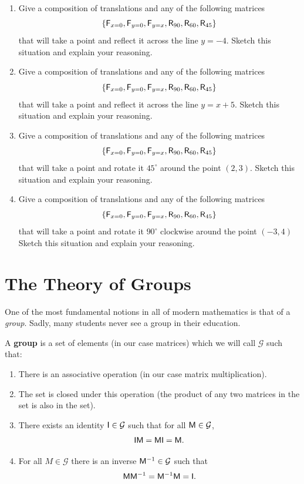\begin{enumerate}
\item Give a composition of translations and any of the following
  matrices
\[
\{\mathsf{F}_{x=0},\mathsf{F}_{y=0}, \mathsf{F}_{y=x}, \mathsf{R}_{90},\mathsf{R}_{60},\mathsf{R}_{45}\}
\]
that will take a point and reflect it across the line $y=-4$. Sketch
this situation and explain your reasoning.

\item Give a composition of translations and any of the following matrices
\[
\{\mathsf{F}_{x=0},\mathsf{F}_{y=0}, \mathsf{F}_{y=x}, \mathsf{R}_{90},\mathsf{R}_{60},\mathsf{R}_{45}\}
\]
that will take a
  point and reflect it across the line $y=x+5$. Sketch this situation
  and explain your reasoning.

\item Give a composition of translations and any of the following matrices
\[
\{
\mathsf{F}_{x=0},\mathsf{F}_{y=0}, \mathsf{F}_{y=x}, \mathsf{R}_{90},\mathsf{R}_{60},\mathsf{R}_{45}\}
\]
that will take a point and rotate it $45^\circ$ around the point
$(2,3)$. Sketch this situation and explain your reasoning.

\item Give a composition of translations and any of the following matrices
\[
\{\mathsf{F}_{x=0},\mathsf{F}_{y=0}, \mathsf{F}_{y=x}, \mathsf{R}_{90},\mathsf{R}_{60},\mathsf{R}_{45}\}
\]
that will take a point and rotate it $90^\circ$ clockwise around the
point $(-3,4)$ Sketch this situation and explain your reasoning.

\end{enumerate}



\newpage



\section{The Theory of Groups}

One of the most fundamental notions in all of modern mathematics is
that of a \textit{group}. Sadly, many students never see a group in their
education.

\begin{dfn}
A \textbf{group} is a set of elements (in our case matrices) which we
will call $\mathcal{G}$ such that: 
\begin{enumerate}
\item There is an associative operation (in our case matrix multiplication).
\item The set is closed under this operation (the product of any two
  matrices in the set is also in the set).
\item There exists an identity $\mathsf{I}\in \mathcal{G}$ such that for all $\mathsf{M}\in \mathcal{G}$, 
\[
\mathsf{I}\mathsf{M}=\mathsf{M}\mathsf{I} = \mathsf{M}.
\]
\item For all $M\in \mathcal{G}$ there is an inverse $\mathsf{M}^{-1}\in \mathcal{G}$ such that 
\[
\mathsf{M} \mathsf{M}^{-1}= \mathsf{M}^{-1}\mathsf{M}= \mathsf{I}.
\]
\end{enumerate}
\end{dfn}


